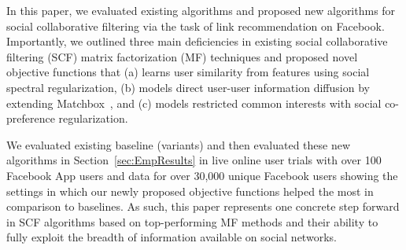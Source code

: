 

In this paper, we evaluated existing algorithms and proposed new
algorithms for social collaborative filtering via the task of link
recommendation on Facebook.  Importantly, we outlined three main
deficiencies in existing social collaborative filtering (SCF) matrix
factorization (MF) techniques and proposed novel objective functions
that (a) learns user similarity from features using social spectral
regularization, (b) models direct user-user information diffusion by
extending Matchbox~\cite{matchbox}, and (c) models restricted common
interests with social co-preference regularization.

We evaluated existing baseline (variants) and then evaluated these new
algorithms in Section~\ref{sec:EmpResults} in live online user trials
with over 100 Facebook App users and data for over 30,000 unique
Facebook users showing the settings in which our newly proposed
objective functions helped the most in comparison to baselines.  As
such, this paper represents one concrete step forward in SCF
algorithms based on top-performing MF methods and their ability to
fully exploit the breadth of information available on social networks.

